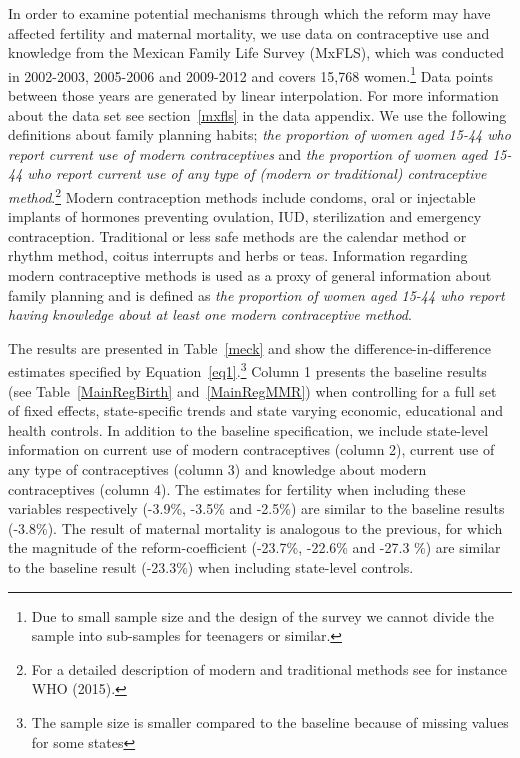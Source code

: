 \documentclass[a4paper, 11pt]{article}
\begin{document}
\begin{spacing}{2}
In order to examine potential mechanisms through which the reform may have affected fertility and maternal mortality, we use data on contraceptive use and knowledge from the Mexican Family Life Survey (MxFLS), which was conducted in 2002-2003, 2005-2006 and 2009-2012 and covers 15,768 women.\footnote{Due to small sample size and the design of the survey we cannot divide the sample into sub-samples for teenagers or similar.} Data points between those years are generated by linear interpolation. For more information about the data set see section~\ref{mxfls} in the data appendix. We use the following definitions about family planning habits; \textit{the proportion of women aged 15-44 who report current use of modern contraceptives} and \textit{the proportion of women aged 15-44 who report current use of any type of (modern or traditional) contraceptive method}.\footnote{For a detailed description of modern and traditional methods see for instance WHO (2015).} Modern contraception methods include condoms, oral or injectable implants of hormones preventing ovulation, IUD, sterilization and emergency contraception. Traditional or less safe methods are the calendar method or rhythm method, coitus interrupts and herbs or teas. Information regarding modern contraceptive methods is used as a proxy of general information about family planning and is defined as \textit{the proportion of women aged 15-44 who report having knowledge about at least one modern contraceptive method}. 

The results are presented in Table~\ref{meck} and show the difference-in-difference estimates specified by Equation~\eqref{eq1}.\footnote{The sample size is smaller compared to the baseline because of missing values for some states} Column 1 presents the baseline results (see Table~\ref{MainRegBirth} and~\ref{MainRegMMR}) when controlling for a full set of fixed effects, state-specific trends and state varying economic, educational and health controls. In addition to the baseline specification, we include state-level information on current use of modern contraceptives (column 2), current use of any type of contraceptives (column 3) and knowledge about modern contraceptives (column 4). The estimates for fertility when including these variables respectively (-3.9\%, -3.5\% and -2.5\%) are similar to the baseline results (-3.8\%). The result of maternal mortality is analogous to the previous, for which the magnitude of the reform-coefficient (-23.7\%, -22.6\% and -27.3 \%) are similar to the baseline result (-23.3\%) when including state-level controls. 


\end{spacing}
\end{document}
